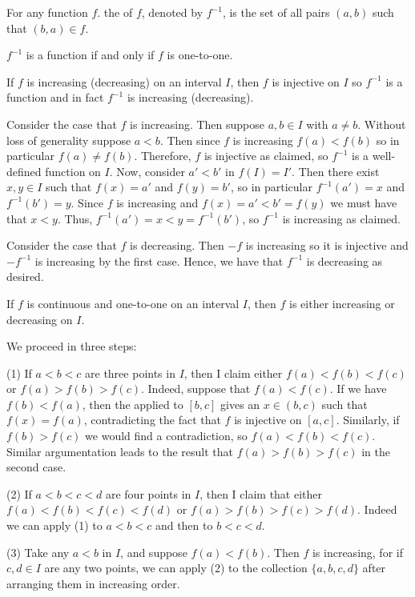 \documentclass[12pt]{report}
\begin{document}
\begin{defn}{}{}
    For any function $f$. the  of $f$, denoted by $f^{-1}$, is the set of all pairs $(a,b)$ such that $(b,a) \in f$.
\end{defn}

\begin{rmk}{}{}
    $f^{-1}$ is a function if and only if $f$ is one-to-one.
\end{rmk}


\begin{thm}{}{}
    If $f$ is increasing (decreasing) on an interval $I$, then $f$ is injective on $I$ so $f^{-1}$ is a function and in fact $f^{-1}$ is increasing (decreasing).
\end{thm}
\begin{proof*}{}{}
    Consider the case that $f$ is increasing. Then suppose $a,b \in I$ with $a \neq b$. Without loss of generality suppose $a < b$. Then since $f$ is increasing $f(a) < f(b)$ so in particular $f(a) \neq f(b)$. Therefore, $f$ is injective as claimed, so $f^{-1}$ is a well-defined function on $I$. Now, consider $a' < b'$ in $f(I) = I'$. Then there exist $x,y \in I$ such that $f(x) = a'$ and $f(y) = b'$, so in particular $f^{-1}(a') = x$ and $f^{-1}(b') = y$. Since $f$ is increasing and $f(x) = a' < b' = f(y)$ we must have that $x < y$. Thus, $f^{-1}(a') = x < y = f^{-1}(b')$, so $f^{-1}$ is increasing as claimed.

    Consider the case that $f$ is decreasing. Then $-f$ is increasing so it is injective and $-f^{-1}$ is increasing by the first case. Hence, we have that $f^{-1}$ is decreasing as desired.
\end{proof*}


\begin{thm}{}{}
    If $f$ is continuous and one-to-one on an interval $I$, then $f$ is either increasing or decreasing on $I$.
\end{thm}
\begin{proof*}{}{}
    We proceed in three steps:

    (1) If $a < b < c$ are three points in $I$, then I claim either $f(a) < f(b) < f(c)$ or $f(a) > f(b) > f(c)$. Indeed, suppose that $f(a) < f(c)$. If we have $f(b) < f(a)$, then the  applied to $[b,c]$ gives an $x \in (b,c)$ such that $f(x) = f(a)$, contradicting the fact that $f$ is injective on $[a,c]$. Similarly, if $f(b) > f(c)$ we would find a contradiction, so $f(a) < f(b) < f(c)$. Similar argumentation leads to the result that $f(a) > f(b) > f(c)$ in the second case.


    (2) If $a < b < c < d$ are four points in $I$, then I claim that either $f(a) < f(b) < f(c) < f(d)$ or $f(a) > f(b) > f(c) > f(d)$. Indeed we can apply (1) to $a<b<c$ and then to $b < c < d$.


    (3) Take any $a < b$ in $I$, and suppose $f(a) < f(b)$. Then $f$ is increasing, for if $c,d \in I$ are any two points, we can apply (2) to the collection $\{a,b,c,d\}$ after arranging them in increasing order.
\end{proof*}
\end{document}
